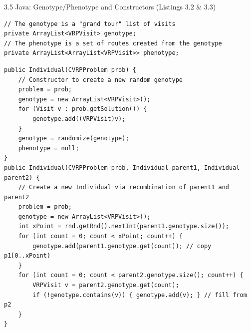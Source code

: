 \documentclass[aspectratio=169,10pt]{beamer}
\begin{document}
\begin{frame}[fragile]{3.5 Java: Genotype/Phenotype and Constructors (Listings 3.2 \& 3.3)}

  \begin{lstlisting}[style=javastyle,caption={Listing 3.2 -- Genotype and phenotype fields within Individual}]
// The genotype is a "grand tour" list of visits
private ArrayList<VRPVisit> genotype;
// The phenotype is a set of routes created from the genotype
private ArrayList<ArrayList<VRPVisit>> phenotype;
  \end{lstlisting}

  \medskip

  \begin{lstlisting}[style=javastyle,caption={Listing 3.3 -- Constructors for Individual}]
public Individual(CVRPProblem prob) {
    // Constructor to create a new random genotype
    problem = prob;
    genotype = new ArrayList<VRPVisit>();
    for (Visit v : prob.getSolution()) {
        genotype.add((VRPVisit)v);
    }
    genotype = randomize(genotype);
    phenotype = null;
}
public Individual(CVRPProblem prob, Individual parent1, Individual parent2) {
    // Create a new Individual via recombination of parent1 and parent2
    problem = prob;
    genotype = new ArrayList<VRPVisit>();
    int xPoint = rnd.getRnd().nextInt(parent1.genotype.size());
    for (int count = 0; count < xPoint; count++) {
        genotype.add(parent1.genotype.get(count)); // copy p1[0..xPoint)
    }
    for (int count = 0; count < parent2.genotype.size(); count++) {
        VRPVisit v = parent2.genotype.get(count);
        if (!genotype.contains(v)) { genotype.add(v); } // fill from p2
    }
}
  \end{lstlisting}

\end{frame}
\end{document}
